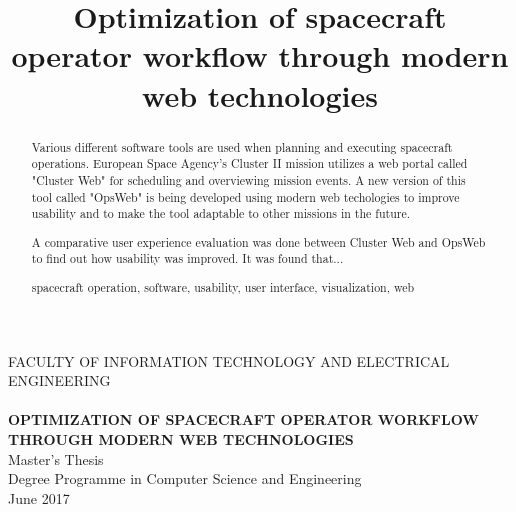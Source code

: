 \documentclass[a4paper, 12pt,titlepage]{dithesis}
\title{Optimization of spacecraft operator workflow through modern web technologies}
\begin{document}
\begin{titlepage}
	{\sffamily\fontsize{9}{1pt}\selectfont FACULTY OF INFORMATION TECHNOLOGY AND ELECTRICAL ENGINEERING\\}
	\vspace{65 mm}
	{\textbf{\fontsize{16}{19pt}\selectfont \getfirstname\ \getlastname }\\}
	\vspace{15 mm}
	{\textbf{\fontsize{18}{22pt}\selectfont OPTIMIZATION OF SPACECRAFT OPERATOR WORKFLOW THROUGH MODERN WEB TECHNOLOGIES\\}}
	\vspace{53 mm}
	{\fontsize{14}{17}\selectfont Master's Thesis \\Degree Programme in Computer Science and Engineering \\ June 2017\\}
\end{titlepage}


\begin{abstract}
Various different software tools are used when planning and executing spacecraft operations. European Space Agency's Cluster II mission utilizes a web portal called "Cluster Web" for scheduling and overviewing mission events. A new version of this tool called "OpsWeb" is being developed using modern web techologies to improve usability and to make the tool adaptable to other missions in the future. 

A comparative user experience evaluation was done between Cluster Web and OpsWeb to find out how usability was improved. It was found that...

\keywords spacecraft operation, software, usability, user interface, visualization, web

\end{abstract}
\end{document}
